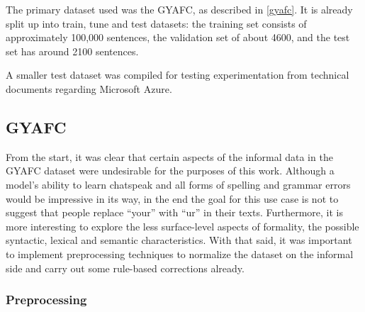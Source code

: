 The primary dataset used was the GYAFC, as described in \ref{gyafc}. It is already split up into train, tune and test datasets: the training set consists of approximately 100,000 sentences, the validation set of about 4600, and the test set has around 2100 sentences.

A smaller test dataset was compiled for testing experimentation from technical documents regarding Microsoft Azure.

\subsection{GYAFC}

From the start, it was clear that certain aspects of the informal data in the GYAFC dataset were undesirable for the purposes of this work. Although a model's ability to learn chatspeak and all forms of spelling and grammar errors would be impressive in its way, in the end the goal for this use case is not to suggest that people replace ``your'' with ``ur'' in their texts. Furthermore, it is more interesting to explore the less surface-level aspects of formality, the possible syntactic, lexical and semantic characteristics. With that said, it was important to implement preprocessing techniques to normalize the dataset on the informal side and carry out some rule-based corrections already.

\subsubsection{Preprocessing}

